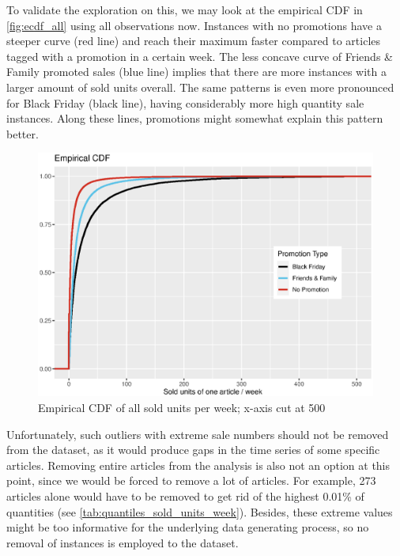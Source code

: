 To validate the exploration on this, we may look at the empirical \ac{CDF} in \autoref{fig:ecdf_all} using all observations now.
Instances with no promotions have a steeper curve (red line) and reach their maximum faster compared to articles tagged with a promotion in a certain week. The less concave curve of Friends \& Family promoted sales (blue line) implies that there are more instances with a larger amount of sold units overall. The same patterns is even more pronounced for Black Friday (black line), having considerably more high quantity sale instances. Along these lines, promotions might somewhat explain this pattern better.\\
 
 
 \begin{figure}[H]
\centering
  \includegraphics[width=0.65\linewidth]{figures/ecdf_all.eps}
  \caption{Empirical \ac{CDF} of all sold units per week; x-axis cut at 500}
  \label{fig:ecdf_all}
\end{figure}



Unfortunately, such outliers with extreme sale numbers should not be removed from the dataset, as it would produce gaps in the time series of some specific articles. Removing entire articles from the analysis is also not an option at this point, since we would be forced to remove a lot of articles.
For example, 273 articles alone would have to be removed to get rid of the highest 0.01\% of quantities (see \autoref{tab:quantiles_sold_units_week}). Besides, these extreme values might be too informative for the underlying data generating process, so no removal of instances is employed to the dataset.








